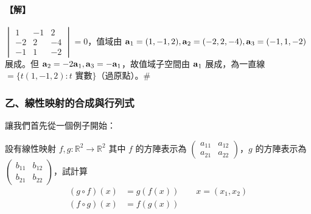 \paragraph{【解】}
$\begin{vmatrix} 1 & -1 & 2 \\ -2 & 2 & -4 \\ -1 & 1 & -2 \end{vmatrix} = 0$，值域由 $\boldsymbol{\mathbf{a}}_1=(1, -1, 2), \boldsymbol{\mathbf{a}}_2=(-2, 2, -4), \boldsymbol{\mathbf{a}}_3=(-1, 1, -2)$ 展成。但 $\boldsymbol{\mathbf{a}}_2 = -2\boldsymbol{\mathbf{a}}_1, \boldsymbol{\mathbf{a}}_3 = -\boldsymbol{\mathbf{a}}_1$，故值域子空間由 $\boldsymbol{\mathbf{a}}_1$ 展成，為一直線 $=\{ t(1, -1, 2) : t \text{ 實數} \}$（過原點）。\hfill$\#$

\subsubsection*{乙、線性映射的合成與行列式}\label{subsec:b6s-1-7-b}
\setcounter{example}{0}

讓我們首先從一個例子開始：

\begin{example}\label{ex:b6s-1-33}
設有線性映射 $f, g: \mathbb{R}^2 \longrightarrow \mathbb{R}^2$ 其中 $f$ 的方陣表示為 $\begin{pmatrix} a_{11} & a_{12} \\ a_{21} & a_{22} \end{pmatrix}$，$g$ 的方陣表示為 $\begin{pmatrix} b_{11} & b_{12} \\ b_{21} & b_{22} \end{pmatrix}$，試計算
\begin{align*}
(g \circ f)(x) &= g(f(x)) \qquad x=(x_1, x_2) \\
(f \circ g)(x) &= f(g(x))
\end{align*}
\end{example}

